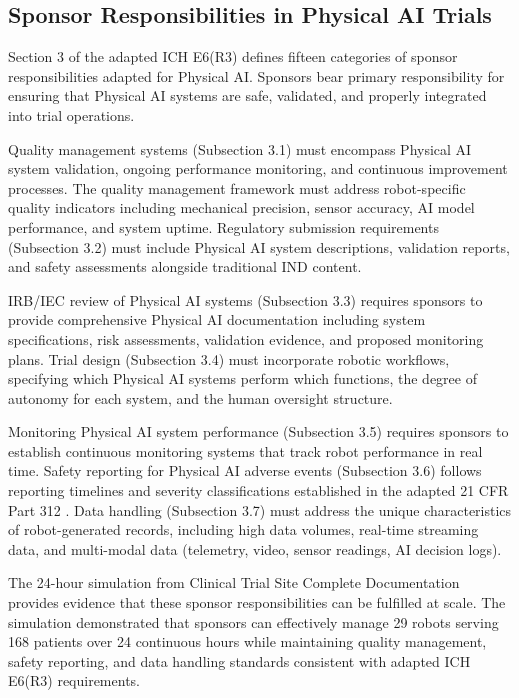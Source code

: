 \subsection{Sponsor Responsibilities in Physical AI Trials}
\label{subsec:ich-sponsor}

Section 3 of the adapted ICH E6(R3) defines fifteen categories of sponsor
responsibilities adapted for Physical AI. Sponsors bear primary responsibility
for ensuring that Physical AI systems are safe, validated, and properly
integrated into trial operations.

Quality management systems (Subsection 3.1) must encompass Physical AI system
validation, ongoing performance monitoring, and continuous improvement
processes. The quality management framework must address robot-specific quality
indicators including mechanical precision, sensor accuracy, AI model
performance, and system uptime. Regulatory submission requirements (Subsection
3.2) must include Physical AI system descriptions, validation reports, and
safety assessments alongside traditional IND content.

IRB/IEC review of Physical AI systems (Subsection 3.3) requires sponsors to
provide comprehensive Physical AI documentation including system specifications,
risk assessments, validation evidence, and proposed monitoring plans. Trial
design (Subsection 3.4) must incorporate robotic workflows, specifying which
Physical AI systems perform which functions, the degree of autonomy for each
system, and the human oversight structure.

Monitoring Physical AI system performance (Subsection 3.5) requires sponsors
to establish continuous monitoring systems that track robot performance in real
time. Safety reporting for Physical AI adverse events (Subsection 3.6) follows
reporting timelines and severity classifications established in the adapted
21 CFR Part 312 \cite{cfr312-adapt}. Data handling (Subsection 3.7) must
address the unique characteristics of robot-generated records, including high
data volumes, real-time streaming data, and multi-modal data (telemetry, video,
sensor readings, AI decision logs).

The 24-hour simulation from Clinical Trial Site Complete Documentation
\cite{site-docs} provides evidence that these sponsor responsibilities can be
fulfilled at scale. The simulation demonstrated that sponsors can effectively
manage 29 robots serving 168 patients over 24 continuous hours while
maintaining quality management, safety reporting, and data handling standards
consistent with adapted ICH E6(R3) requirements.

